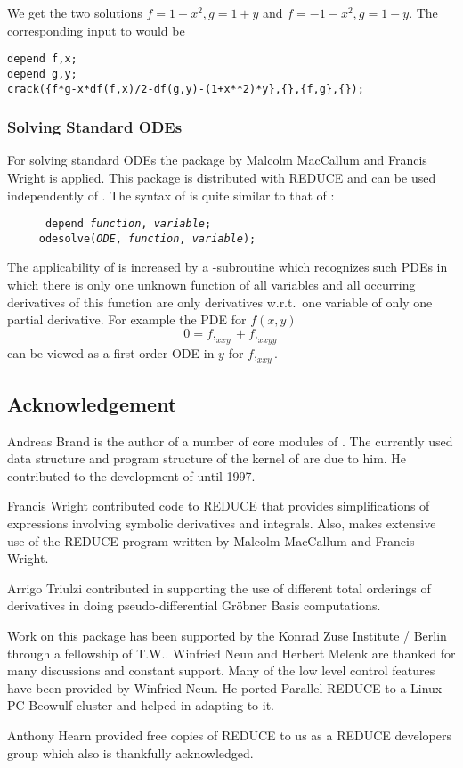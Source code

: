 We get the two solutions $f = 1 + x^2, g = 1 + y$ and $f = - 1 - x^2,
g = 1 - y$.  The corresponding input to  would be
\begin{verbatim}
depend f,x;
depend g,y;
crack({f*g-x*df(f,x)/2-df(g,y)-(1+x**2)*y},{},{f,g},{});
\end{verbatim}

\subsubsection{Solving Standard ODEs}

For solving standard ODEs the package  by Malcolm
MacCallum and Francis Wright \cite{MacCallum:1989} is applied.  This
package is distributed with REDUCE and can be used independently of
.  The syntax of  is quite similar to
that of :
\begin{flushleft}\tt
~~~~~depend \textit{function}, \textit{variable}; \\
~~~~~odesolve(\textit{ODE}, \textit{function}, \textit{variable});
\end{flushleft}
The applicability of  is increased by a
-subroutine which recognizes such PDEs in which there
is only one unknown function of all variables and all occurring
derivatives of this function are only derivatives w.r.t.\ one variable
of only one partial derivative.  For example the PDE for $f(x,y)$
\[ 0 = f,_{xxy} + f,_{xxyy} \]
can be viewed as a first order ODE in $y$ for $f,_{xxy}$.

\subsection*{Acknowledgement}

Andreas Brand is the author of a number of core modules of
.  The currently used data structure and program
structure of the kernel of  are due to him.  He
contributed to the development of  until 1997.

Francis Wright contributed code to REDUCE that provides
simplifications of expressions involving symbolic derivatives and
integrals.  Also,  makes extensive use of the REDUCE
program  written by Malcolm MacCallum and Francis
Wright.

Arrigo Triulzi contributed in supporting the use of different total
orderings of derivatives in doing pseudo-differential Gr\"{o}bner
Basis computations.

Work on this package has been supported by the Konrad Zuse Institute /
Berlin through a fellowship of T.W..  Winfried Neun and Herbert Melenk
are thanked for many discussions and constant support.  Many of the
low level control features have been provided by Winfried Neun.  He
ported Parallel REDUCE to a Linux PC Beowulf cluster and helped in
adapting  to it.

Anthony Hearn provided free copies of REDUCE to us as a REDUCE
developers group which also is thankfully acknowledged.
